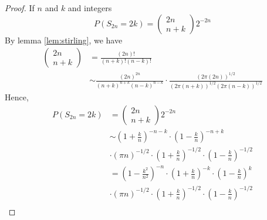 \begin{proof}
	If $n$ and $k$ and integers
	\begin{equation*}
		P\left(S_{2 n}=2 k\right)=\left(\begin{array}{c}
				2 n \\
				n+k
			\end{array}\right) 2^{-2 n}
	\end{equation*}
	By lemma \ref{lem:stirling}, we have
	\begin{equation*}
		\begin{aligned}
			\left(\begin{array}{c}
					      2 n \\
					      n+k
				      \end{array}\right) & =\frac{(2 n) !}{(n+k) !(n-k) !}                                                                                           \\
			                       & \sim \frac{(2 n)^{2 n}}{(n+k)^{n+k}(n-k)^{n-k}} \cdot \frac{(2 \pi(2 n))^{1 / 2}}{(2 \pi(n+k))^{1 / 2}(2 \pi(n-k))^{1 / 2}}
		\end{aligned}
	\end{equation*}
	Hence,
	\begin{equation*}
		\begin{aligned}
			P\left(S_{2 n}=2 k\right) & =
			\left(\begin{array}{c}
					      2 n \\
					      n+k
				      \end{array}\right) 2^{-2 n}                                                                                                             \\
			                          & \sim\left(1+\frac{k}{n}\right)^{-n-k} \cdot\left(1-\frac{k}{n}\right)^{-n+k}                                      \\
			                          & \cdot(\pi n)^{-1 / 2} \cdot\left(1+\frac{k}{n}\right)^{-1 / 2} \cdot\left(1-\frac{k}{n}\right)^{-1 / 2}           \\
			                          & =\left(1-\frac{k^{2}}{n^{2}}\right)^{-n} \cdot\left(1+\frac{k}{n}\right)^{-k} \cdot\left(1-\frac{k}{n}\right)^{k} \\
			                          & \cdot(\pi n)^{-1 / 2} \cdot\left(1+\frac{k}{n}\right)^{-1 / 2} \cdot\left(1-\frac{k}{n}\right)^{-1 / 2}           \\
		\end{aligned}
	\end{equation*}

\end{proof}
